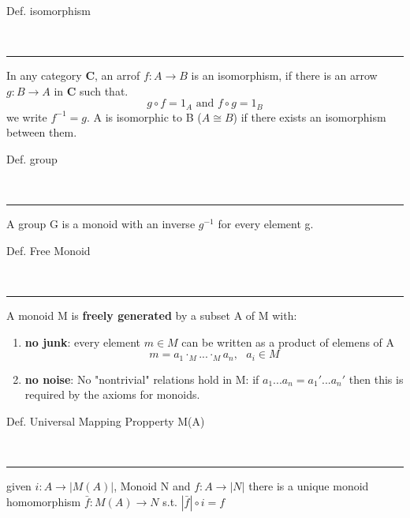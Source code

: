 \begin{note}
  \begin{field}
    Def. isomorphism
  \end{field} \\
  \noindent\rule[0.5ex]{\linewidth}{1pt}
  \begin{field}
    In any category \textbf{C}, an arrof $f: A\rightarrow B$ is an isomorphism, if there is an arrow $g: B\rightarrow A$ in \textbf{C} such that.
    \[ g\circ f = 1_A\text{ and }f\circ g = 1_B \]
    we write $f^{-1} = g$.
    A is isomorphic to B ($A\cong B$) if there exists an isomorphism between them.
  \end{field}
\end{note}

\begin{note}
  \begin{field}
    Def. group
  \end{field} \\
  \noindent\rule[0.5ex]{\linewidth}{1pt}
  \begin{field}
    A group G is a monoid with an inverse $g^{-1}$ for every element g.
  \end{field}
\end{note}

\begin{note}
  \begin{field}
    Def. Free Monoid
  \end{field} \\
  \noindent\rule[0.5ex]{\linewidth}{1pt}
  \begin{field}
    A monoid M is \textbf{freely generated} by a subset A of M with:
    \begin{enumerate}
      \item \textbf{no junk}: every element $m\in M$ can be written as a product of elemens of A\\
        \[ m = a_1 \cdot_M ... \cdot_M a_n,\ \ \ a_i\in M \]
      \item \textbf{no noise}: No "nontrivial" relations hold in M: if $a_1 ... a_n = a_1' ... a_n'$ then this is required by the axioms for monoids.
    \end{enumerate}
  \end{field}
\end{note}

\begin{note}
  \begin{field}
    Def. Universal Mapping Propperty M(A)
  \end{field} \\
  \noindent\rule[0.5ex]{\linewidth}{1pt}
  \begin{field}
    given $i: A \rightarrow |M(A)|$, Monoid N and $f: A \rightarrow |N|$ there is a unique monoid homomorphism $\bar f: M(A) \rightarrow N$ s.t. $|\bar f|\circ i = f$
  \end{field}
\end{note}

